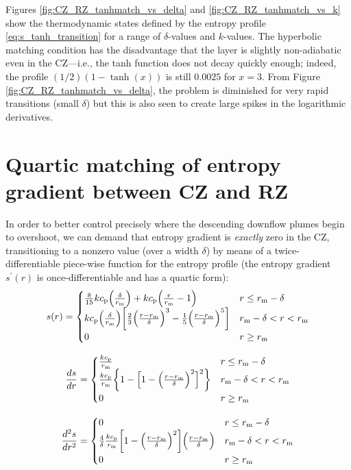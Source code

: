 \documentclass[12pt]{article} %
\newcommand{\rrm}{r_{\rm{m}}}
\newcommand{\cp}{c_{\rm{p}}}
\begin{document}
Figures \ref{fig:CZ_RZ_tanhmatch_vs_delta} and \ref{fig:CZ_RZ_tanhmatch_vs_k} show the thermodynamic states defined by the entropy profile \eqref{eq:s_tanh_transition} for a range of $\delta$-values and $k$-values. The hyperbolic matching condition has the disadvantage that the layer is slightly non-adiabatic even in the CZ---i.e., the tanh function does not decay quickly enough; indeed, the profile $(1/2)(1-\tanh(x))$ is still $0.0025$ for $x=3$. From Figure \ref{fig:CZ_RZ_tanhmatch_vs_delta}, the problem is diminished for very rapid transitions (small $\delta$) but this is also seen to create large spikes in the logarithmic derivatives. 

\section{Quartic matching of entropy gradient between CZ and RZ}
 In order to better control precisely where the descending downflow plumes begin to overshoot, we can demand that entropy gradient is \textit{exactly} zero in the CZ, transitioning to a nonzero value (over a width $\delta$) by means of a twice-differentiable piece-wise function for the entropy profile (the entropy gradient $s^\prime(r)$ is once-differentiable and has a quartic form):
\begin{equation}\label{eq:s_quart_transition}
s(r) = \begin{cases}
\frac{8}{15}k\cp\Big{(}\frac{\delta}{\rrm}\Big{)} + k\cp\Big{(}\frac{r}{\rrm} - 1\Big{)} &r\leq \rrm - \delta\\
k\cp\Big{(}\frac{\delta}{\rrm}\Big{)}\bigg{[}\frac{2}{3}\Big{(}\frac{r-\rrm}{\delta}\Big{)}^3 - \frac{1}{5} \Big{(}\frac{r-\rrm}{\delta}\Big{)}^5\bigg{]} & \rrm - \delta < r < \rrm\\
0 & r\geq \rrm
\end{cases}
\end{equation}

\begin{equation}\label{eq:dsdr_quart_transition}
\frac{ds}{dr} = \begin{cases}
\frac{k\cp}{\rrm} & r\leq \rrm - \delta\\
\frac{k\cp}{\rrm}\bigg{\{}1 - \Big{[}1 - \Big{(}\frac{r-\rrm}{\delta}\Big{)}^2\Big{]}^2\bigg{\}} & \rrm - \delta < r < \rrm\\
0 & r\geq \rrm
\end{cases}
\end{equation}

\begin{equation}\label{eq:d2sdr2_quart_transition}
\frac{d^2s}{dr^2} = \begin{cases}
0 & r\leq \rrm - \delta\\
\frac{4}{\delta}\frac{k\cp}{\rrm}\bigg{[}1 - \Big{(}\frac{r-\rrm}{\delta}\Big{)}^2\bigg{]}\Big{(}\frac{r-\rrm}{\delta}\Big{)} & \rrm - \delta < r < \rrm\\
0 & r\geq \rrm
\end{cases}
\end{equation}
\end{document}
